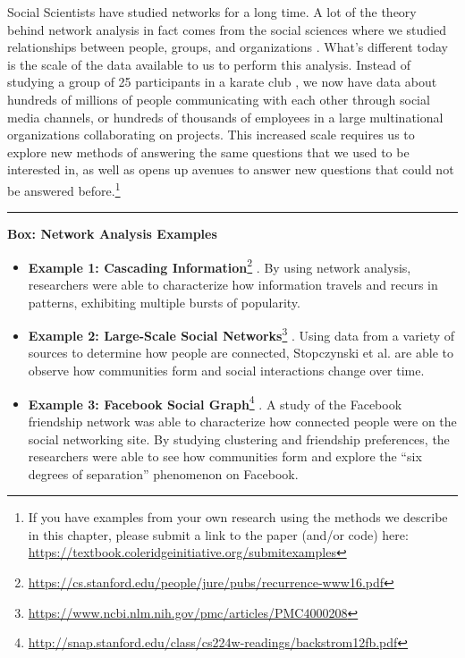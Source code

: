 \documentclass[]{krantz}
\begin{document}
Social Scientists have studied networks for a long time. A lot of the
theory behind network analysis in fact comes from the social sciences
where we studied relationships between people, groups, and organizations
\citep{moreno1934}. What's different today is the scale of the data
available to us to perform this analysis. Instead of studying a group of
25 participants in a karate club \citep{zachary1977}, we now have data
about hundreds of millions of people communicating with each other
through social media channels, or hundreds of thousands of employees in
a large multinational organizations collaborating on projects. This
increased scale requires us to explore new methods of answering the same
questions that we used to be interested in, as well as opens up avenues
to answer new questions that could not be answered before.\footnote{If
  you have examples from your own research using the methods we describe
  in this chapter, please submit a link to the paper (and/or code) here:
  \url{https://textbook.coleridgeinitiative.org/submitexamples}}

\begin{center}\rule{0.5\linewidth}{\linethickness}\end{center}

\textbf{Box: Network Analysis Examples}

\begin{itemize}
\item
  \textbf{Example 1: Cascading Information}\footnote{\url{https://cs.stanford.edu/people/jure/pubs/recurrence-www16.pdf}}
  \citep{ugander2011}. By using network analysis, researchers were able
  to characterize how information travels and recurs in patterns,
  exhibiting multiple bursts of popularity.
\item
  \textbf{Example 2: Large-Scale Social Networks}\footnote{\url{https://www.ncbi.nlm.nih.gov/pmc/articles/PMC4000208}}
  \citep{stopczynski2014}. Using data from a variety of sources to
  determine how people are connected, Stopczynski et al. are able to
  observe how communities form and social interactions change over time.
\item
  \textbf{Example 3: Facebook Social Graph}\footnote{\url{http://snap.stanford.edu/class/cs224w-readings/backstrom12fb.pdf}}
  \citep{cheng2016}. A study of the Facebook friendship network was able
  to characterize how connected people were on the social networking
  site. By studying clustering and friendship preferences, the
  researchers were able to see how communities form and explore the
  ``six degrees of separation'' phenomenon on Facebook.
\end{itemize}
\end{document}
